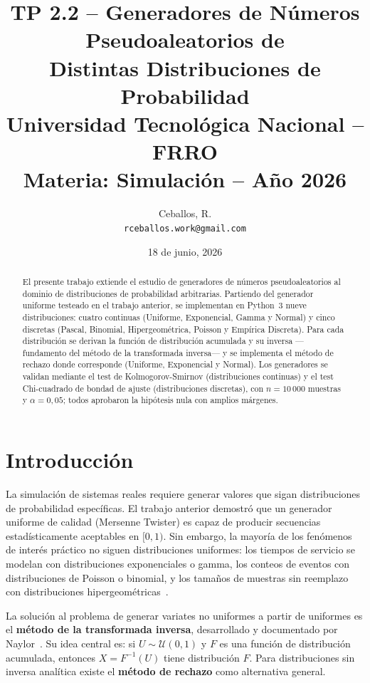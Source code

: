 \documentclass[a4paper, 11pt]{article}
\title{%
  \textbf{TP 2.2 -- Generadores de Números Pseudoaleatorios de\\
  Distintas Distribuciones de Probabilidad} \\[6pt]
  \large Universidad Tecnológica Nacional -- FRRO \\
  \large Materia: Simulación -- Año 2026
}
\author{
  Ceballos, R. \\
  \texttt{rceballos.work@gmail.com}
}
\date{18 de junio, 2026}
\begin{document}
\maketitle

\begin{abstract}
El presente trabajo extiende el estudio de generadores de números pseudoaleatorios
al dominio de distribuciones de probabilidad arbitrarias. Partiendo del generador
uniforme testeado en el trabajo anterior, se implementan en Python~3 nueve
distribuciones: cuatro continuas (Uniforme, Exponencial, Gamma y Normal) y cinco
discretas (Pascal, Binomial, Hipergeométrica, Poisson y Empírica Discreta).
Para cada distribución se derivan la función de distribución acumulada y su
inversa —fundamento del método de la transformada inversa— y se implementa el
método de rechazo donde corresponde (Uniforme, Exponencial y Normal).
Los generadores se validan mediante el test de Kolmogorov-Smirnov (distribuciones
continuas) y el test Chi-cuadrado de bondad de ajuste (distribuciones discretas),
con $n = 10\,000$ muestras y $\alpha = 0{,}05$; todos aprobaron la hipótesis nula
con amplios márgenes.
\end{abstract}

\section{Introducción}

La simulación de sistemas reales requiere generar valores que sigan distribuciones
de probabilidad específicas. El trabajo anterior demostró que un generador uniforme
de calidad (Mersenne Twister) es capaz de producir secuencias estadísticamente
aceptables en $[0,1)$. Sin embargo, la mayoría de los fenómenos de interés práctico
no siguen distribuciones uniformes: los tiempos de servicio se modelan con
distribuciones exponenciales o gamma, los conteos de eventos con distribuciones de
Poisson o binomial, y los tamaños de muestras sin reemplazo con distribuciones
hipergeométricas~\cite{law2015simulation}.

La solución al problema de generar variates no uniformes a partir de uniformes es
el \textbf{método de la transformada inversa}, desarrollado y documentado por
Naylor~\cite{naylor1982tecnicas}. Su idea central es: si $U \sim \mathcal{U}(0,1)$
y $F$ es una función de distribución acumulada, entonces $X = F^{-1}(U)$ tiene
distribución $F$. Para distribuciones sin inversa analítica existe el
\textbf{método de rechazo} como alternativa general.
\end{document}
